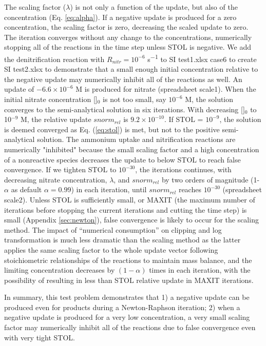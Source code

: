 \documentclass[gmd, manuscript]{copernicus}
\begin{document}
The scaling factor ($\lambda$) is not only a function of the update, but also
of the  concentration (Eq. \ref{eq:alpha}). If a negative update is produced
for a zero concentration, the scaling factor is zero, decreasing the scaled
update to zero. The iteration converges without any change to the
concentrations, numerically stopping all of the reactions in the time step unless
STOL is negative. We add  the denitrification reaction with $R_{nitr} =
10^{-6}$ \unit{s^{-1}} to SI test1.xlsx case6 to create SI test2.xlsx to
demonstrate that a small enough initial concentration relative to the negative
update may numerically inhibit all of the reactions as well.
An update of $-6.6 \times 10^{-6}$ \unit{M} is produced for nitrate
(spreadsheet scale1). When the initial nitrate concentration []$_0$
is not too small, say $10^{-6}$ \unit{M}, the solution converges to the semi-analytical
solution in six iterations. With decreasing []$_0$ to 10$^{-9}$
\unit{M}, the relative update $snorm_{rel}$ is $9.2\times 10^{-10}$. If STOL =
$10^{-9}$, the solution is deemed converged as Eq. (\ref{eq:stol}) is met, but
not to the positive semi-analytical solution. The ammonium uptake and nitrification
reactions are numerically "inhibited" because the small scaling factor and a
high concentration of a nonreactive species decreases the update to
below STOL to reach false convergence. If we tighten STOL to $10^{-30}$, the
iterations continues, with decreasing nitrate concentration, $\lambda$, and
$snorm_{rel}$ by two orders of magnitude (1-$\alpha$ as default $\alpha=0.99$) in each
iteration, until $snorm_{rel}$  reaches $10^{-30}$ (spreadsheet scale2). Unless STOL is
sufficiently small, or MAXIT (the maximum number of iterations before stopping
the current iterations and cutting the time step) is small (Appendix
\ref{sec:newton}), false convergence is likely to occur for the scaling method. The impact of
``numerical consumption'' on clipping and log transformation is much less
dramatic than the scaling method as the latter applies the same scaling factor
to the whole update vector following stoichiometric relationships of the
reactions to maintain mass balance, and the limiting concentration decreases by
$(1-\alpha)$ times in each iteration, with the possibility of resulting in less
than STOL relative update in MAXIT iterations.  

In summary, this test problem demonstrates that 1) a negative update can be
produced even for products during a Newton-Raphson iteration; 2) when a negative
update is produced for a very low concentration, a very small scaling factor
may numerically inhibit all of the reactions due to false convergence even with very tight STOL.
\end{document}
